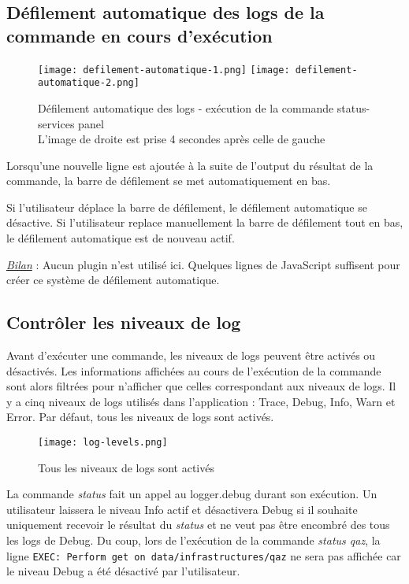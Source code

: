 \subsection{Défilement automatique des logs de la commande en cours d'exécution}

\begin{figure}[H]
  \texttt{[image: defilement-automatique-1.png]}
  \texttt{[image: defilement-automatique-2.png]}
  \caption{Défilement automatique des logs - exécution de la commande
    status-services panel\\L'image de droite est prise 4 secondes après celle de gauche}
\end{figure}

Lorsqu'une nouvelle ligne est ajoutée à la suite de l'output du résultat de la
commande, la barre de défilement se met automatiquement en bas.

Si l'utilisateur déplace la barre de défilement, le défilement automatique se
désactive.
Si l'utilisateur replace manuellement la barre de défilement tout en bas,
le défilement automatique est de nouveau actif.

\underline{\textit{Bilan}} : Aucun plugin n'est utilisé ici. Quelques lignes de
JavaScript suffisent pour créer ce système de défilement automatique.

\subsection{Contrôler les niveaux de log}

Avant d'exécuter une commande, les niveaux de logs peuvent être activés ou
désactivés. Les informations affichées au cours de l'exécution de la commande
sont alors filtrées pour n'afficher que celles correspondant aux niveaux de logs.
Il y a cinq niveaux de logs utilisés dans l'application : 
Trace, Debug, Info, Warn et Error.
Par défaut, tous les niveaux de logs sont activés.

\begin{figure}[H]
  \texttt{[image: log-levels.png]}
  \caption{Tous les niveaux de logs sont activés}
\end{figure}

\bigskip

La commande \textit{status} fait un appel au logger.debug durant son exécution.
Un utilisateur laissera le niveau Info actif et désactivera Debug
si il souhaite uniquement recevoir le résultat du \textit{status} et ne veut pas
être encombré des tous les logs de Debug.
Du coup, lors de l'exécution de la commande \textit{status qaz}, la ligne
\verb?EXEC: Perform get on data/infrastructures/qaz? ne sera pas affichée car le
niveau Debug a été désactivé par l'utilisateur.


